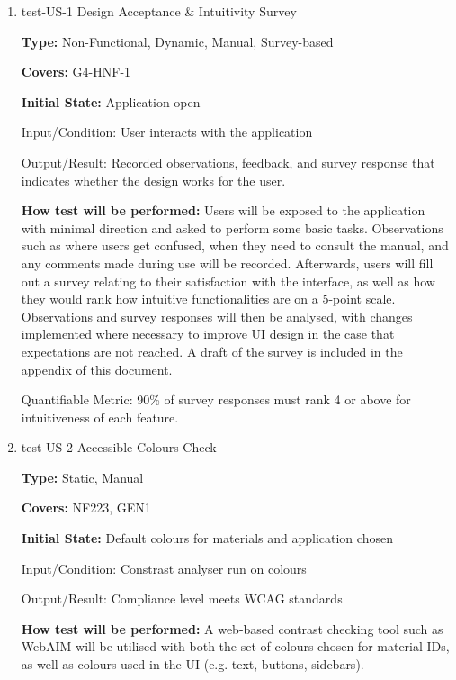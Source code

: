 \documentclass[12pt, titlepage]{article}
\begin{document}
\begin{enumerate}

\item{test-US-1 Design Acceptance \& Intuitivity Survey\\}

\textbf{Type:} Non-Functional, Dynamic, Manual, Survey-based

\textbf{Covers:} G4-HNF-1
					
\textbf{Initial State:} Application open
					
Input/Condition: User interacts with the application
					
Output/Result: Recorded observations, feedback, and survey response that indicates whether the design works for the user.
					
\textbf{How test will be performed:} Users will be exposed to the application with minimal direction and asked to perform 
some basic tasks. Observations such as where users get confused, when they need to consult the manual, and any comments
made during use will be recorded. Afterwards, users will fill out a survey relating to their satisfaction with the interface, 
as well as how they would rank how intuitive functionalities are on a 5-point scale. Observations and survey responses will then be analysed, with
changes implemented where necessary to improve UI design in the case that expectations are not reached. A draft of the survey
is included in the appendix of this document.

Quantifiable Metric: 90\% of survey responses must rank 4 or above for intuitiveness of each feature.

\item{test-US-2 Accessible Colours Check\\}

\textbf{Type:} Static, Manual

\textbf{Covers:} NF223, GEN1 %
					
\textbf{Initial State:} Default colours for materials and application chosen
					
Input/Condition: Constrast analyser run on colours
					
Output/Result: Compliance level meets WCAG standards
					
\textbf{How test will be performed:} A web-based contrast checking tool such as WebAIM will be utilised with both the set of colours chosen 
for material IDs, as well as colours used in the UI (e.g. text, buttons, sidebars).


\end{enumerate}
\end{document}
